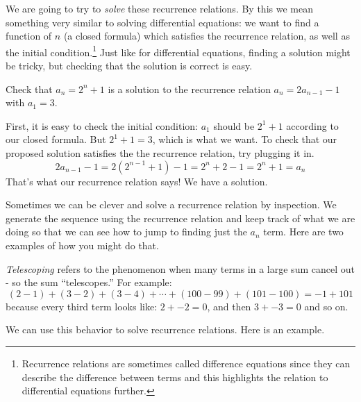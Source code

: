 \documentclass[12pt]{article}
\begin{document}
 
We are going to try to {\em solve} these recurrence relations.  By this we mean something very similar to solving differential equations: we want to find a function of $n$ (a closed formula) which satisfies the recurrence relation, as well as the initial condition.\footnote{Recurrence relations are sometimes called difference equations since they can describe the difference between terms and this highlights the relation to differential equations further.} Just like for differential equations, finding a solution might be tricky, but checking that the solution is correct is easy.
 
 \begin{example}
    Check that $a_n = 2^n + 1$ is a solution to the recurrence relation $a_n = 2a_{n-1} - 1$ with $a_1 = 3$. 
    \begin{solution}
      First, it is easy to check the initial condition: $a_1$ should be $2^1 + 1$ according to our closed formula.  But $2^1 + 1 = 3$, which is what we want.  To check that our proposed solution satisfies the the recurrence relation, try plugging it in.
      \[2a_{n-1} - 1 = 2(2^{n-1} + 1) - 1 = 2^n + 2 - 1 = 2^n +1 = a_n\]
      That's what our recurrence relation says!  We have a solution.
    \end{solution}

 \end{example}

 

Sometimes we can be clever and solve a recurrence relation by inspection.  We generate the sequence using the recurrence relation and keep track of what we are doing so that we can see how to jump to finding just the $a_n$ term.  Here are two examples of how you might do that.
%

{\em Telescoping} refers to the phenomenon when many terms in a large sum cancel out - so the sum ``telescopes.''  For example:
\[(2 - 1) + (3 - 2) + (3 - 4) + \cdots + (100 - 99) + (101 - 100) = -1 + 101\]
because every third term looks like: $2 + -2 = 0$, and then $3 + -3 = 0$ and so on.

We can use this behavior to solve recurrence relations.  Here is an example.
\end{document}
